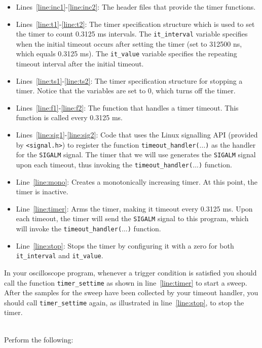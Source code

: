 \documentclass[epsfig,10pt,fullpage]{article}
\begin{document}
\begin{itemize}
\item Lines~\ref{line:inc1}-\ref{line:inc2}: The header files that provide the timer 
functions.
\item Lines~\ref{line:t1}-\ref{line:t2}: The timer specification structure which is used to set the timer to count 0.3125 ms intervals. The \texttt{it\_interval} variable specifies when the initial timeout occurs after setting the timer (set to 312500 ns, which equals 0.3125 ms). The \texttt{it\_value} variable specifies the repeating timeout interval after the initial timeout.
\item Lines~\ref{line:ts1}-\ref{line:ts2}: The timer specification structure for stopping a timer. Notice that the variables are set to 0, which turns off the timer.
\item Lines~\ref{line:f1}-\ref{line:f2}: The function that handles a timer timeout. This function is called every 0.3125 ms. 
\item Lines~\ref{line:sig1}-\ref{line:sig2}: Code that uses the Linux signalling API 
(provided by \texttt{<signal.h>}) to register the function \texttt{timeout\_handler($\ldots$)} as 
the handler for the \texttt{SIGALM} signal. The timer that we will use generates the 
\texttt{SIGALM} signal upon each timeout, thus invoking the
\texttt{timeout\_handler($\ldots$)} function.
\item Line~\ref{line:mono}: Creates a monotonically increasing timer. At this point, the timer is inactive.
\item Line~\ref{line:timer}: Arms the timer, making it timeout every 0.3125 ms. Upon each 
timeout, the timer will send the \texttt{SIGALM} signal to this program, which will invoke 
the \texttt{timeout\_handler($\ldots$)} function.
\item Line~\ref{line:stop}: Stops the timer by configuring it with a zero for both 
\texttt{it\_interval} and \texttt{it\_value}.
\end{itemize}

\noindent
In your oscilloscope program, whenever a trigger condition is satisfied you should call the 
function \texttt{timer\_settime} as shown in line~\ref{line:timer} to start a sweep. After the
samples for the sweep have been collected by your timeout handler, you should 
call \texttt{timer\_settime} again, as illustrated in line~\ref{line:stop}, to stop the timer.

~\\
\noindent
Perform the following:
\end{document}
